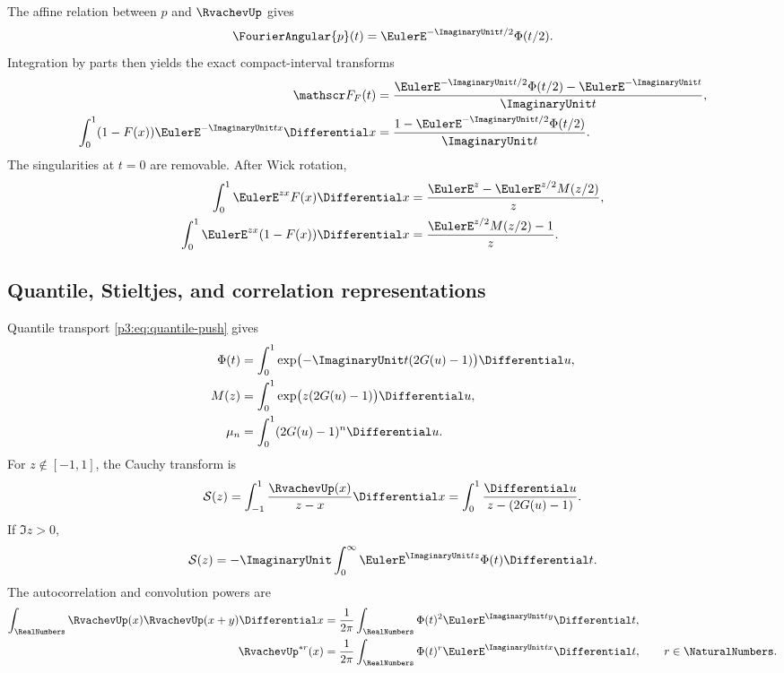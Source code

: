 \documentclass[11pt]{article}
\theoremstyle{definition}
\theoremstyle{remark}
\begin{document}
The affine relation between $p$ and $\RvachevUp$ gives
\begin{equation}\label{p3:eq:p-transform}
 \FourierAngular{p}(t)=\EulerE^{-\ImaginaryUnit t/2}\Phi(t/2).
\end{equation}
Integration by parts then yields the exact compact-interval transforms
\begin{align}
 \mathscr F_F(t)
 &=\frac{\EulerE^{-\ImaginaryUnit t/2}\Phi(t/2)-\EulerE^{-\ImaginaryUnit t}}{\ImaginaryUnit t},
 \label{p3:eq:F-transform-product}\\
 \int_0^1(1-F(x))\EulerE^{-\ImaginaryUnit tx}\Differential x
 &=\frac{1-\EulerE^{-\ImaginaryUnit t/2}\Phi(t/2)}{\ImaginaryUnit t}.
 \label{p3:eq:survival-transform-product}
\end{align}
The singularities at $t=0$ are removable.  After Wick rotation,
\begin{align}
 \int_0^1\EulerE^{zx}F(x)\Differential x
 &=\frac{\EulerE^z-\EulerE^{z/2}M(z/2)}{z},\label{p3:eq:F-Laplace}\\
 \int_0^1\EulerE^{zx}(1-F(x))\Differential x
 &=\frac{\EulerE^{z/2}M(z/2)-1}{z}.
 \label{p3:eq:survival-Laplace}
\end{align}

\subsection{Quantile, Stieltjes, and correlation representations}

Quantile transport \eqref{p3:eq:quantile-push} gives
\begin{align}
 \Phi(t)&=\int_0^1\exp\bigl(-\ImaginaryUnit t(2G(u)-1)\bigr)\Differential u,
 \label{p3:eq:Phi-quantile}\\
 M(z)&=\int_0^1\exp\bigl(z(2G(u)-1)\bigr)\Differential u,
 \label{p3:eq:M-quantile}\\
 \mu_n&=\int_0^1(2G(u)-1)^n\Differential u.\label{p3:eq:moments-quantile}
\end{align}
For $z\notin[-1,1]$, the Cauchy transform is
\begin{equation}\label{p3:eq:Cauchy-quantile}
 \mathcal S(z)=\int_{-1}^1\frac{\RvachevUp(x)}{z-x}\Differential x
 =\int_0^1\frac{\Differential u}{z-(2G(u)-1)}.
\end{equation}
If $\Im z>0$,
\begin{equation}\label{p3:eq:Cauchy-Fourier}
 \mathcal S(z)=-\ImaginaryUnit\int_0^\infty\EulerE^{\ImaginaryUnit tz}\Phi(t)\Differential t.
\end{equation}
The autocorrelation and convolution powers are
\begin{align}
 \int_\RealNumbers\RvachevUp(x)\RvachevUp(x+y)\Differential x
 &=\frac1{2\pi}\int_\RealNumbers\Phi(t)^2\EulerE^{\ImaginaryUnit ty}\Differential t,
 \label{p3:eq:autocorrelation}\\
 \RvachevUp^{*r}(x)&=\frac1{2\pi}\int_\RealNumbers\Phi(t)^r\EulerE^{\ImaginaryUnit tx}\Differential t,
 \qquad r\in\NaturalNumbers.\label{p3:eq:convolution-powers}
\end{align}
\end{document}
